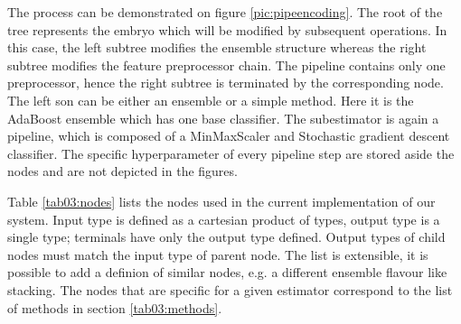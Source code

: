 The process can be demonstrated on figure
\ref{pic:pipeencoding}. The root of the tree represents the embryo which will
be modified by subsequent operations. In this case, the left subtree modifies
the ensemble structure whereas the right subtree modifies the feature
preprocessor chain. The pipeline contains only one preprocessor, hence the
right subtree is terminated by the corresponding node. The left son can be
either an ensemble or a simple method. Here it is the AdaBoost ensemble which
has one base classifier. The subestimator is again a pipeline, which is composed
of a MinMaxScaler and Stochastic gradient descent classifier. The specific
hyperparameter of every pipeline step are stored aside the nodes and are not
depicted in the figures.

Table \ref{tab03:nodes} lists the nodes used in the current implementation of
our system. Input type is defined as a cartesian product of types, output type
is a single type; terminals have only the output type defined. Output types of
child nodes must match the input type of parent node. The list is extensible,
it is possible to add a definion of similar nodes, e.g. a different ensemble
flavour like stacking. The nodes that are specific for a given estimator
correspond to the list of methods in section \ref{tab03:methods}.


